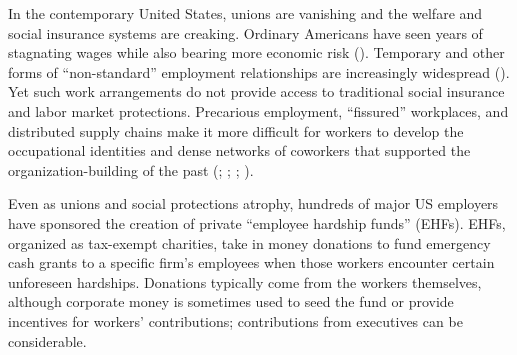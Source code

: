 \documentclass[
  11pt,
  oneside]{article}
\begin{document}
In the contemporary United States, unions are vanishing and the welfare and social insurance systems are creaking. Ordinary Americans have seen years of stagnating wages while also bearing more economic risk (). Temporary and other forms of ``non-standard'' employment relationships are increasingly widespread (). Yet such work arrangements do not provide access to traditional social insurance and labor market protections. Precarious employment, ``fissured'' workplaces, and distributed supply chains make it more difficult for workers to develop the occupational identities and dense networks of coworkers that supported the organization-building of the past (; ; ; ).

Even as unions and social protections atrophy, hundreds of major US employers have sponsored the creation of private ``employee hardship funds'' (EHFs). EHFs, organized as tax-exempt charities, take in money donations to fund emergency cash grants to a specific firm's employees when those workers encounter certain unforeseen hardships. Donations typically come from the workers themselves, although corporate money is sometimes used to seed the fund or provide incentives for workers' contributions; contributions from executives can be considerable.
\end{document}

